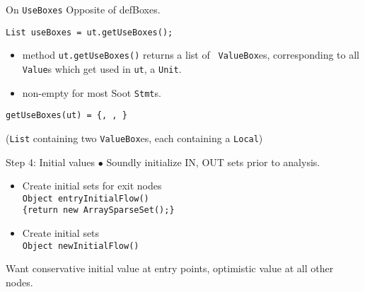 \begin{slide}{On {\tt UseBoxes}}
\vspace*{-0.1in}
Opposite of defBoxes.

{\tt List useBoxes = ut.getUseBoxes();}

\vspace*{-0.05in}
\begin{itemize}
\item method {\red \tt ut.getUseBoxes()} returns a list of {\tt
ValueBox}es, corresponding to all {\tt Value}s which get used
in {\tt ut}, a {\tt Unit}. 

\item non-empty for most Soot {\tt Stmt}s.
\end{itemize}

\vspace*{-0.08in}
\begin{center}
\end{center}

\vspace*{0.05in}
{\tt getUseBoxes(ut) = \{, , \}}\\
\qquad \qquad \begin{minipage}{0.8\textwidth} 
({\tt List} containing two {\tt ValueBox}es, each containing a {\tt Local})
\end{minipage}

\end{slide}

\begin{slide}{Step 4: Initial values}
\vspace*{-0.15in}
$\bullet$ Soundly initialize IN, OUT sets prior to analysis.

\vspace*{-0.1in}
\begin{itemize}
\item Create initial sets for exit nodes\\
{\tt Object entryInitialFlow() \\ 
\qquad \{return new ArraySparseSet();\} }

\item Create initial sets\\
{\tt Object newInitialFlow()}\\

\end{itemize}

Want conservative initial value at entry points, optimistic
value at all other nodes.
\end{slide}

